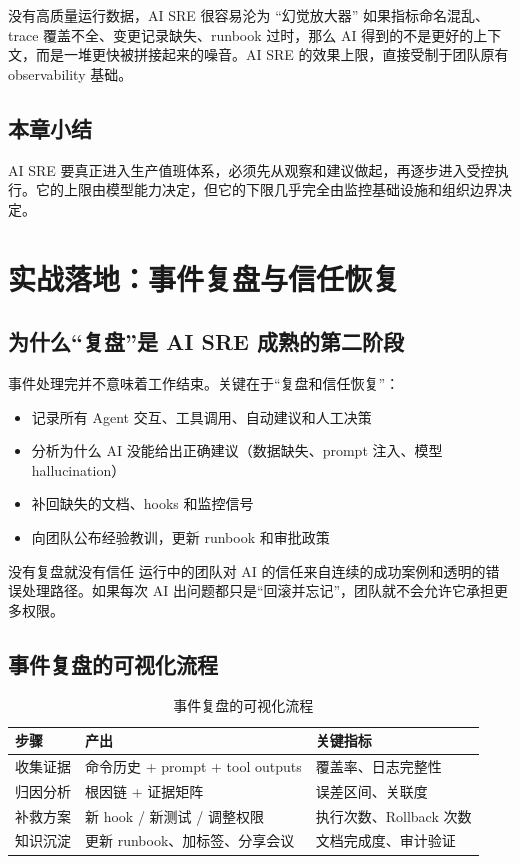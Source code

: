 \documentclass[a4paper]{article}
\begin{document}
\begin{warningbox}{没有高质量运行数据，AI SRE 很容易沦为 ``幻觉放大器''}
如果指标命名混乱、trace 覆盖不全、变更记录缺失、runbook 过时，那么 AI 得到的不是更好的上下文，而是一堆更快被拼接起来的噪音。AI SRE 的效果上限，直接受制于团队原有 observability 基础。
\end{warningbox}

\subsection{本章小结}

AI SRE 要真正进入生产值班体系，必须先从观察和建议做起，再逐步进入受控执行。它的上限由模型能力决定，但它的下限几乎完全由监控基础设施和组织边界决定。

\section{实战落地：事件复盘与信任恢复}

\subsection{为什么“复盘”是 AI SRE 成熟的第二阶段}

事件处理完并不意味着工作结束。关键在于“复盘和信任恢复”：

\begin{itemize}
    \item 记录所有 Agent 交互、工具调用、自动建议和人工决策
    \item 分析为什么 AI 没能给出正确建议（数据缺失、prompt 注入、模型 hallucination）
    \item 补回缺失的文档、hooks 和监控信号
    \item 向团队公布经验教训，更新 runbook 和审批政策
\end{itemize}

\begin{warningbox}{没有复盘就没有信任}
运行中的团队对 AI 的信任来自连续的成功案例和透明的错误处理路径。如果每次 AI 出问题都只是“回滚并忘记”，团队就不会允许它承担更多权限。
\end{warningbox}

\subsection{事件复盘的可视化流程}

\begin{table}[H]
\centering
\begin{tabular}{p{} p{} p{}}
\toprule
步骤 & 产出 & 关键指标 \\
\midrule
收集证据 & 命令历史 + prompt + tool outputs & 覆盖率、日志完整性 \\
归因分析 & 根因链 + 证据矩阵 & 误差区间、关联度 \\
补救方案 & 新 hook / 新测试 / 调整权限 & 执行次数、Rollback 次数 \\
知识沉淀 & 更新 runbook、加标签、分享会议 & 文档完成度、审计验证 \\
\bottomrule
\end{tabular}
\caption{事件复盘的可视化流程}
\end{table}
\end{document}
